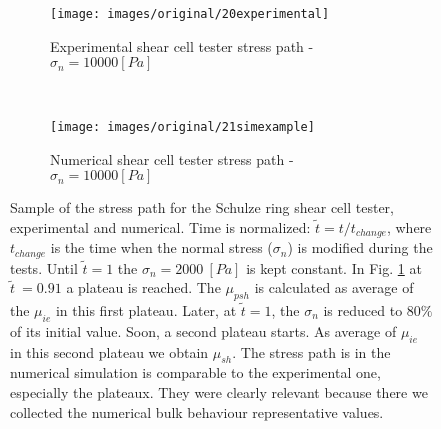 \begin{figure}[htp] \centering
    \begin{subfigure}[b]{0.96\columnwidth}
        \texttt{[image: images/original/20experimental]}
        \caption{Experimental shear cell tester stress path - $\sigma_n = 10000
        [Pa]$}
        \label{fig:20experimental} 
    \end{subfigure}\\
        \begin{subfigure}[b]{0.96\columnwidth}
        \texttt{[image: images/original/21simexample]}
        \caption{Numerical shear cell tester stress path - $\sigma_n = 10000
        [Pa]$}
        \label{fig:21simexample} 
    \end{subfigure}
    \caption[Stress path]{Sample of the stress path for
	the Schulze ring shear cell tester, experimental and numerical.
	Time is normalized: $\tilde{t} = t/t_{change}$, where $t_{change}$ is the
	time when the normal stress ($\sigma_n$) is modified during the tests.
	Until $\tilde{t}=1$ the $\sigma_n = 2000 ~[Pa]$ is kept constant. 
	In Fig. \ref{fig:20experimental} at $\tilde{t}~=0.91$
 	a plateau is reached.
	The $\mu_{psh}$ is calculated as average of the $\mu_{ie}$ in this first
	plateau.
	Later, at $\tilde{t}=1$, the $\sigma_n$ is reduced to $80 \%$ of its initial
	value.
	Soon, a second plateau starts.
	As average of $\mu_{ie}$ in this second plateau we obtain $\mu_{sh}$.
	The stress path is in the numerical simulation is comparable to the
	experimental one, especially the plateaux.
	They were clearly relevant because there we collected the numerical bulk
	behaviour representative values. }
    \label{fig:40experimentalsimulation}
\end{figure}
